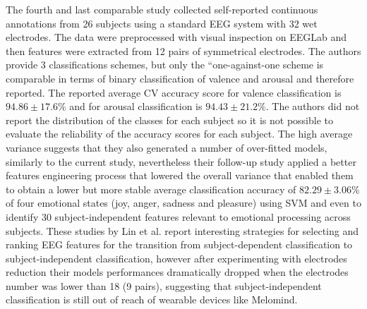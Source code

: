 The fourth and last comparable study \cite{lin_eeg-based_2009} collected self-reported continuous annotations from 26 subjects using a standard EEG system with 32 wet electrodes. The data were preprocessed with visual inspection on EEGLab and then features were extracted from 12 pairs of symmetrical electrodes. The authors provide 3 classifications schemes, but only the “one-against-one scheme is comparable in terms of binary classification of valence and arousal and therefore reported. The reported average \ac{CV} accuracy score for valence classification is \(94.86\pm17.6\%\)  and for arousal classification is \(94.43\pm21.2\%\). The authors did not report the distribution of the classes for each subject so it is not possible to evaluate the reliability of the accuracy scores for each subject. The high average variance suggests that they also generated a number of over-fitted models, similarly to the current study, nevertheless their follow-up study \cite{lin_eeg-based_2010} applied a better features engineering process that lowered the overall variance that enabled them to obtain a lower but more stable average classification accuracy of \(82.29\pm3.06\% \) of four emotional states (joy, anger, sadness and pleasure) using \ac{SVM} and even to identify 30 subject-independent features relevant to emotional processing across subjects. These studies by Lin et al. report interesting strategies for selecting and ranking EEG features for the transition from subject-dependent classification to subject-independent classification, however after experimenting with electrodes reduction their models performances dramatically dropped when the electrodes number was lower than 18 (9 pairs), suggesting that subject-independent classification is still out of reach of wearable devices like Melomind.
